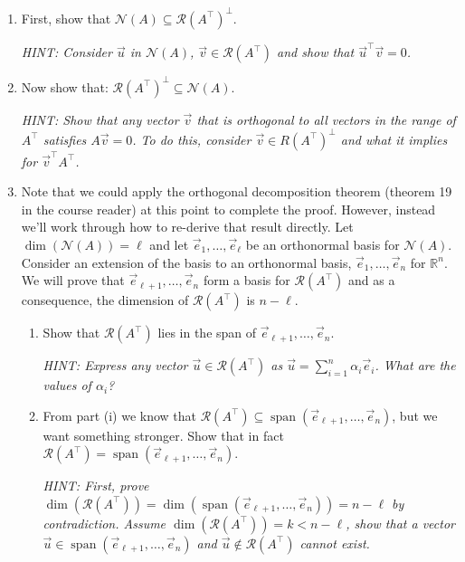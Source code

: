 \documentclass[10pt]{article}
\theoremstyle{definition}
\theoremstyle{plain}
\newcommand{\RR}{\mathbb{R}}
\newcommand{\NN}{\mathcal{N}}
\newcommand{\Range}{\mathcal{R}}
\DeclareMathOperator{\spn}{span}
\newcommand{\vv}[1]{\vec{#1}}
\begin{document}
\begin{enumerate}[label=(\alph*)]
\item First, show that $\NN(A) \subseteq \Range\!\left(A^\top\right)^\perp$.

\textit{HINT: Consider $\vv{u}$ in $\NN(A)$, $\vv{v} \in \Range\!\left(A^\top\right)$ and show that $\vv{u}^\top \vv{v} = 0$.}

\item Now show that: $\Range\!\left(A^\top\right)^\perp \subseteq \NN(A)$.

\textit{HINT: Show that any vector $\vv{v}$ that is orthogonal to all vectors in the range of $A^\top$ satisfies $A\vv{v} = 0$. To do this, consider $\vv{v} \in R(A^\top)^\perp$ and what it implies for $\vv{v}^\top A^\top$.}

\item Note that we could apply the orthogonal decomposition theorem (theorem 19 in the course reader) at this point to complete the proof. However, instead we'll work through how to re-derive that result directly. Let $\dim(\NN(A)) = \ell$ and let $\vv{e}_1, \ldots, \vv{e}_\ell$ be an orthonormal basis for $\NN(A)$. Consider an extension of the basis to an orthonormal basis, $\vv{e}_1, \ldots, \vv{e}_n$ for $\RR^n$. We will prove that $\vv{e}_{\ell+1}, \ldots, \vv{e}_n$ form a basis for $\Range\!\left(A^\top\right)$ and as a consequence, the dimension of $\Range\!\left(A^\top\right)$ is $n - \ell$.

\begin{enumerate}[label=\roman*.]
\item Show that $\Range\!\left(A^\top\right)$ lies in the span of $\vv{e}_{\ell+1}, \ldots, \vv{e}_n$.

\textit{HINT: Express any vector $\vv{u} \in \Range\!\left(A^\top\right)$ as $\vv{u} = \sum_{i=1}^{n} \alpha_i \vv{e}_i$. What are the values of $\alpha_i$?}

\item From part (i) we know that $\Range\!\left(A^\top\right) \subseteq \spn(\vv{e}_{\ell+1}, \ldots, \vv{e}_n)$, but we want something stronger. Show that in fact $\Range\!\left(A^\top\right) = \spn(\vv{e}_{\ell+1}, \ldots, \vv{e}_n)$.

\textit{HINT: First, prove $\dim\!\left(\Range\!\left(A^\top\right)\right) = \dim(\spn(\vv{e}_{\ell+1}, \ldots, \vv{e}_n)) = n - \ell$ by contradiction. Assume $\dim\!\left(\Range\!\left(A^\top\right)\right) = k < n - \ell$, show that a vector $\vv{u} \in \spn(\vv{e}_{\ell+1}, \ldots, \vv{e}_n)$ and $\vv{u} \notin \Range\!\left(A^\top\right)$ cannot exist.}


\end{enumerate}
\end{enumerate}
\end{document}
